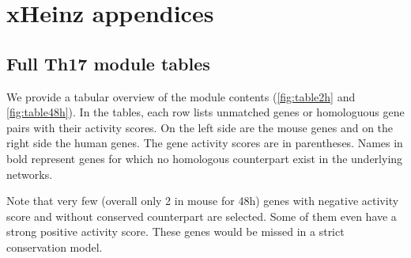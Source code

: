 \chapter{xHeinz appendices}

\section{Full Th17 module tables}
\label{app:details}

We provide a tabular overview of the module contents (\cref{fig:table2h} and \cref{fig:table48h}).
In the tables, each row lists unmatched genes or homologuous gene pairs with their activity scores.
On the left side are the mouse genes and on the right side the human genes.
The gene activity scores are in parentheses.
Names in bold represent genes for which no homologous counterpart exist in the underlying networks.

Note that very few (overall only 2 in mouse for \unit{48}{h}) genes with negative activity score and without conserved counterpart are selected.
Some of them even have a strong positive activity score.
These genes would be missed in a strict conservation model.%



